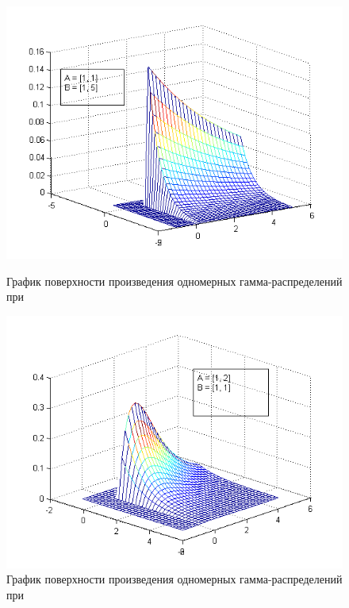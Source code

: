 \begin{figure}[h]
  \begin{minipage}[h]{0.49\linewidth}
    \includegraphics[width=1\linewidth]{../pic/new/gamma_mesh_3}
    \caption{График поверхности произведения одномерных гамма-распределений при}
  \end{minipage}
  \hfill
  \begin{minipage}[h]{0.49\linewidth}
    \vspace{4mm}
    \includegraphics[width=1\linewidth]{../pic/new/gamma_mesh_4}
    \caption{График поверхности произведения одномерных гамма-распределений при}
  \end{minipage}
\end{figure}

